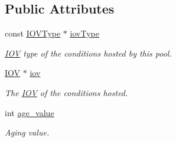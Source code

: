 \subsection*{Public Attributes}
\begin{DoxyCompactItemize}
\item 
const \hyperlink{class_d_d4hep_1_1_i_o_v_type}{I\+O\+V\+Type} $\ast$ \hyperlink{class_d_d4hep_1_1_conditions_1_1_conditions_pool_a517c78c83270296921430bbd85ab1782}{iov\+Type}
\begin{DoxyCompactList}\small\item\em \hyperlink{class_d_d4hep_1_1_i_o_v}{I\+OV} type of the conditions hosted by this pool. \end{DoxyCompactList}\item 
\hyperlink{class_d_d4hep_1_1_i_o_v}{I\+OV} $\ast$ \hyperlink{class_d_d4hep_1_1_conditions_1_1_conditions_pool_a5c86deb9085a420b2d8355ca835f3fc9}{iov}
\begin{DoxyCompactList}\small\item\em The \hyperlink{class_d_d4hep_1_1_i_o_v}{I\+OV} of the conditions hosted. \end{DoxyCompactList}\item 
int \hyperlink{class_d_d4hep_1_1_conditions_1_1_conditions_pool_af75e42540703ef23e16c26a5655f2319}{age\+\_\+value}
\begin{DoxyCompactList}\small\item\em Aging value. \end{DoxyCompactList}\end{DoxyCompactItemize}
